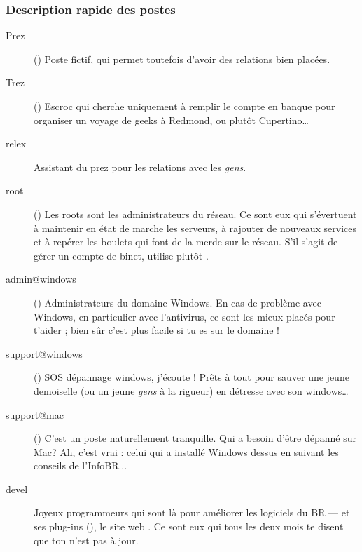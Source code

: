 \subsubsection*{Description rapide des postes}

\begin{description}

  \item[Prez]{() Poste fictif, qui permet toutefois d'avoir
des relations bien plac\'ees.}

  \item[Trez]{() Escroc qui cherche uniquement \`a remplir le compte en banque pour organiser un voyage de geeks \`a Redmond, ou plut\^ot Cupertino\dots}

  \item[relex]{Assistant du prez pour les relations avec les \emph{gens}.}

  \item[root]{() Les roots sont les administrateurs du r\'eseau. Ce sont eux qui s'\'evertuent \`a maintenir en \'etat de marche les serveurs, \`a rajouter de nouveaux services et \`a rep\'erer les boulets qui font de la merde sur le r\'eseau. S'il s'agit de g\'erer un compte de binet, utilise plut\^ot .}

  \item[admin@windows] {() Administrateurs du domaine Windows. En cas de probl\`eme avec Windows, en particulier avec l'antivirus, ce sont les mieux plac\'es pour t'aider ; bien s\^ur c'est plus facile si tu es sur le domaine !
}
  \item[support@windows] {() SOS d\'epannage windows, j'\'ecoute ! Pr\^ets \`a tout pour sauver une jeune demoiselle (ou un jeune \emph{gens} \`a la rigueur) en d\'etresse avec son windows\dots }

  \item[support@mac] {() C'est un poste naturellement tranquille. Qui a besoin d'\^etre d\'epann\'e sur Mac? Ah, c'est vrai : celui qui a install\'e Windows dessus en suivant les conseils de l'InfoBR... }

  \item[devel]{Joyeux programmeurs qui sont l\`a pour am\'eliorer les logiciels du BR ---  et ses plug-ins (), le site web . Ce sont eux qui tous les deux mois te disent que ton  n'est pas \`a jour.}


\end{description}
